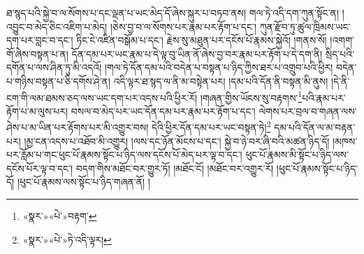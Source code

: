 ཐ་སྙད་པའི་སྐྱེ་བ་ལ་སོགས་པ་དང་ལྡན་པ་ཡང་མེད་དོ་ཞེས་སྐུར་པ་བཏབ་ནས། གལ་ཏེ་འདི་དག་ཀུན་སྟོང་ན། །འབྱུང་བ་མེད་ཅིང་འཇིག་པ་མེད། །ཅེས་བྱ་བ་ལ་སོགས་པར་རྣམ་པར་རྟོག་པ་དང་། ཀུན་རྫོབ་ཏུ་ཚུལ་ཁྲིམས་ཡང་དག་པར་བླང་བ་དང་། ཏིང་ངེ་འཛིན་བསྒོམ་པ་དང་། རྗེས་སུ་མཐུན་པར་དངོས་པོ་རྣམས་སྐྱེའོ། །གནས་སོ། །འགག་གོ་ཞེས་བསྟན་པ་ན། དོན་དམ་པར་ཡང་རྣམ་པ་དེ་ལྟ་བུ་ཡིན་ནོ་ཞེས་བྱ་བར་རྣམ་པར་རྟོག་པ་དེ་དག་ནི། སྲིད་པའི་དགོན་པ་ལས་ཤིན་ཏུ་མི་འདའོ། །གལ་ཏེ་དོན་དམ་པའི་བདེན་པ་བསྟན་པ་ཉིད་ཀྱིས་ཐར་པ་འགྲུབ་པའི་ཕྱིར། བདེན་པ་གཉིས་བསྟན་པ་ཅི་དགོས་ཤེ་ན། འདི་ལྟར་ཐ་སྙད་ལ་ནི་མ་བསྟེན་པར། །དམ་པའི་དོན་ནི་བསྟན་མི་ནུས། །དེ་ནི་ངག་གི་ལམ་ཐམས་ཅད་ལས་ཡང་དག་པར་འདས་པའི་ཕྱིར་རོ། །གཞན་གྱིས་ཡོངས་སུ་བརྟགས་\footnote{«སྣར་»«པེ་»བརྟག་}པའི་རྣམ་པར་རྟོག་པ་མ་ལུས་པར། བསལ་བ་མེད་པར་ཡང་དོན་དམ་པར་རྣམ་པར་རྟོག་པ་དང་། ལེགས་པར་བྲལ་བ་གཞན་ལས་ཤེས་པ་མ་ཡིན་པར་རྟོགས་པར་མི་འགྱུར་བས། དེའི་ཕྱིར་དོན་དམ་པར་ཡང་བསྟན་ཏེ།\footnote{«སྣར་»«པེ་»ཏེ་འདི་ལྟར།} དམ་པའི་དོན་ལ་མ་བརྟན་པར། །མྱ་ངན་འདས་པ་འཐོབ་མི་འགྱུར། །ལས་དང་ཉོན་མོངས་པ་དང་། སྐྱེ་བ་ཉེ་བར་ཞི་བའི་མཚན་ཉིད་དོ། །མཁས་པར་རློམ་པ་གང་ཕུང་པོ་རྣམས་སྟོང་པ་ཉིད་ལས་དངོས་པོ་མེད་པར་ལྟ་བ་དང་། ཕུང་པོ་རྣམས་མི་སྟོང་པ་ཉིད་ལས་དངོས་པོར་ལྟ་བ་དང་། བདག་གིས་མཐོང་བར་གྱུར་ཏོ། །མཐོང་ངོ། །མཐོང་བར་འགྱུར་རོ། །ཕུང་པོ་རྣམས་སྟོང་པ་ཉིད་དོ། །ཕུང་པོ་རྣམས་ལས་སྟོང་པ་ཉིད་གཞན་ནོ། །
